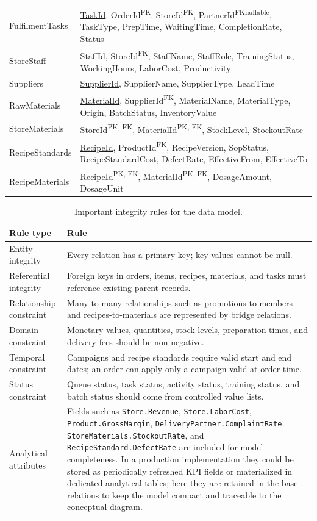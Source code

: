\documentclass[12pt,a4paper]{article}
\newcommand{\pk}[1]{\underline{#1}}
\newcommand{\fk}{\textsuperscript{FK}}
\newcommand{\pkfk}{\textsuperscript{PK, FK}}
\newcommand{\nullable}{\textsuperscript{nullable}}
\begin{document}
\begin{longtable}{P{3.1cm}P{11.35cm}}
FulfilmentTasks & \pk{TaskId}, OrderId\fk, StoreId\fk, PartnerId\fk\nullable, TaskType, PrepTime, WaitingTime, CompletionRate, Status \\
StoreStaff & \pk{StaffId}, StoreId\fk, StaffName, StaffRole, TrainingStatus, WorkingHours, LaborCost, Productivity \\
Suppliers & \pk{SupplierId}, SupplierName, SupplierType, LeadTime \\
RawMaterials & \pk{MaterialId}, SupplierId\fk, MaterialName, MaterialType, Origin, BatchStatus, InventoryValue \\
StoreMaterials & \pk{StoreId}\pkfk, \pk{MaterialId}\pkfk, StockLevel, StockoutRate \\
RecipeStandards & \pk{RecipeId}, ProductId\fk, RecipeVersion, SopStatus, RecipeStandardCost, DefectRate, EffectiveFrom, EffectiveTo \\
RecipeMaterials & \pk{RecipeId}\pkfk, \pk{MaterialId}\pkfk, DosageAmount, DosageUnit \\
\end{longtable}
\normalsize

\begin{table}[H]
\centering
\small
\caption{Important integrity rules for the data model.}
\begin{tabularx}{\textwidth}{P{4.0cm}Y}
\toprule
\textbf{Rule type} & \textbf{Rule} \\
\midrule
Entity integrity & Every relation has a primary key; key values cannot be null. \\
Referential integrity & Foreign keys in orders, items, recipes, materials, and tasks must reference existing parent records. \\
Relationship constraint & Many-to-many relationships such as promotions-to-members and recipes-to-materials are represented by bridge relations. \\
Domain constraint & Monetary values, quantities, stock levels, preparation times, and delivery fees should be non-negative. \\
Temporal constraint & Campaigns and recipe standards require valid start and end dates; an order can apply only a campaign valid at order time. \\
Status constraint & Queue status, task status, activity status, training status, and batch status should come from controlled value lists. \\
\midrule
Analytical attributes & Fields such as \texttt{Store.Revenue}, \texttt{Store.LaborCost}, \texttt{Product.GrossMargin}, \texttt{DeliveryPartner.ComplaintRate}, \texttt{StoreMaterials.StockoutRate}, and \texttt{RecipeStandard.DefectRate} are included for model completeness. In a production implementation they could be stored as periodically refreshed KPI fields or materialized in dedicated analytical tables; here they are retained in the base relations to keep the model compact and traceable to the conceptual diagram. \\
\bottomrule
\end{tabularx}
\end{table}
\end{document}
